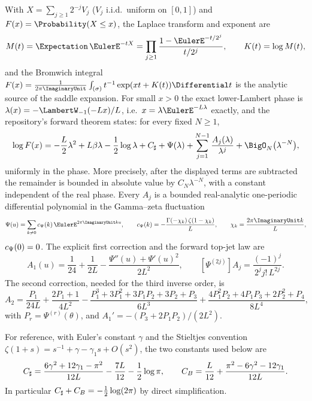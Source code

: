 With $X=\sum_{j\ge1}2^{-j}V_j$ ($V_j$ i.i.d.\ uniform on $[0,1]$) and
$F(x)=\Probability(X\le x)$, the Laplace transform and exponent are
\begin{equation}
 M(t)=\Expectation\,\EulerE^{-tX}
 =\prod_{j\ge1}\frac{1-\EulerE^{-t/2^{j}}}{t/2^{j}},
 \qquad
 K(t)=\log M(t),
 \label{ao:eq:K-def}
\end{equation}
and the Bromwich integral
$F(x)=\frac1{2\pi\ImaginaryUnit}\int_{(\sigma)}t^{-1}\exp(xt+K(t))\Differential t$ is the
analytic source of the saddle expansion.  For small $x>0$ the exact
lower-Lambert phase is
$\lambda(x)=-\LambertW_{-1}(-Lx)/L$, i.e.\
$x=\lambda\EulerE^{-L\lambda}$ exactly, and the repository's forward
theorem states: for every fixed $N\ge1$,
\begin{equation}
 \log F(x)=
 -\frac L2\lambda^{2}+L\beta\lambda-\frac12\log\lambda
 +\Csharp+\Psi(\lambda)
 +\sum_{j=1}^{N-1}\frac{A_j(\lambda)}{\lambda^{j}}
 +\BigO_N\bigl(\lambda^{-N}\bigr),
 \label{ao:eq:forward-all-orders}
\end{equation}
uniformly in the phase.  More precisely, after the displayed terms are
subtracted the remainder is bounded in absolute value by
$C_N\lambda^{-N}$, with a constant independent of the real phase.  Every
$A_j$ is a bounded real-analytic one-periodic differential polynomial in the
Gamma--zeta fluctuation
\begin{equation}
 \Psi(u)=\sum_{k\ne0}\Psihat(k)\,\EulerE^{2\pi\ImaginaryUnit ku},
 \qquad
 \Psihat(k)=-\frac{\Gamma(-\chi_k)\,\zeta(1-\chi_k)}{L},
 \qquad
 \chi_k=\frac{2\pi\ImaginaryUnit k}{L},
 \label{ao:eq:Psi-Fourier}
\end{equation}
$c_{\Psi}(0)=0$.  The explicit first correction and the forward
top-jet law are
\begin{equation}
 A_1(u)=\frac1{24}+\frac1{2L}
 -\frac{\Psi''(u)+\Psi'(u)^{2}}{2L^{2}},
 \qquad
 [\Psi^{(2j)}]A_j=\frac{(-1)^{j}}{2^{j}j!\,L^{2j}}.
 \label{ao:eq:A1-and-topjet}
\end{equation}
The second correction, needed for the third inverse order, is
\begin{equation}
 A_2=\frac{P_1}{24L}+\frac{2P_1+1}{4L^{2}}
 -\frac{P_1^{3}+3P_1^{2}+3P_1P_2+3P_2+P_3}{6L^{3}}
 +\frac{4P_1^{2}P_2+4P_1P_3+2P_2^{2}+P_4}{8L^{4}},
 \label{ao:eq:A2}
\end{equation}
with $P_r=\Psi^{(r)}(\theta)$, and
$A_1'=-(P_3+2P_1P_2)/(2L^{2})$.

For reference, with Euler's constant $\gamma$ and the Stieltjes convention
$\zeta(1+s)=s^{-1}+\gamma-\gamma_1s+O(s^2)$, the two constants used below are
\begin{equation}
 C_{\sharp}=\frac{6\gamma^2+12\gamma_1-\pi^2}{12L}
 -\frac{7L}{12}-\frac12\log\pi,
 \qquad
 C_B=\frac L{12}+\frac{\pi^2-6\gamma^2-12\gamma_1}{12L}.
 \label{ao:eq:constants}
\end{equation}
In particular $C_{\sharp}+C_B=-\tfrac12\log(2\pi)$ by direct simplification.

